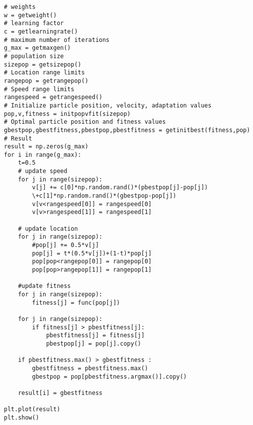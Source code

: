 \documentclass[twocolumn]{article}
\begin{document}
\begin{lstlisting}
# weights
w = getweight()
# learning factor
c = getlearningrate()
# maximum number of iterations
g_max = getmaxgen()
# population size
sizepop = getsizepop()
# Location range limits
rangepop = getrangepop()
# Speed range limits
rangespeed = getrangespeed()
# Initialize particle position, velocity, adaptation values
pop,v,fitness = initpopvfit(sizepop)
# Optimal particle position and fitness values
gbestpop,gbestfitness,pbestpop,pbestfitness = getinitbest(fitness,pop)
# Result
result = np.zeros(g_max)
for i in range(g_max):
	t=0.5
	# update speed
	for j in range(sizepop):
		v[j] += c[0]*np.random.rand()*(pbestpop[j]-pop[j])
		\+c[1]*np.random.rand()*(gbestpop-pop[j])
		v[v<rangespeed[0]] = rangespeed[0]
		v[v>rangespeed[1]] = rangespeed[1]

	# update location
	for j in range(sizepop):
		#pop[j] += 0.5*v[j]
		pop[j] = t*(0.5*v[j])+(1-t)*pop[j]
		pop[pop<rangepop[0]] = rangepop[0]
		pop[pop>rangepop[1]] = rangepop[1]

	#update fitness
	for j in range(sizepop):
		fitness[j] = func(pop[j])

	for j in range(sizepop):
		if fitness[j] > pbestfitness[j]:
			pbestfitness[j] = fitness[j]
			pbestpop[j] = pop[j].copy()

	if pbestfitness.max() > gbestfitness :
		gbestfitness = pbestfitness.max()
		gbestpop = pop[pbestfitness.argmax()].copy()

	result[i] = gbestfitness

plt.plot(result)
plt.show()
\end{lstlisting}
\end{document}
